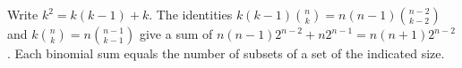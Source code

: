 Write $ k^2=k(k-1)+k $. The identities $ k(k-1)\binom nk=n(n-1)\binom{n-2}{k-2}$ and $ k\binom nk=n\binom{n-1}{k-1}$ give a sum of $ n(n-1)2^{n-2}+n2^{n-1}=n(n+1)2^{n-2}$. Each binomial sum equals the number of subsets of a set of the indicated size.
